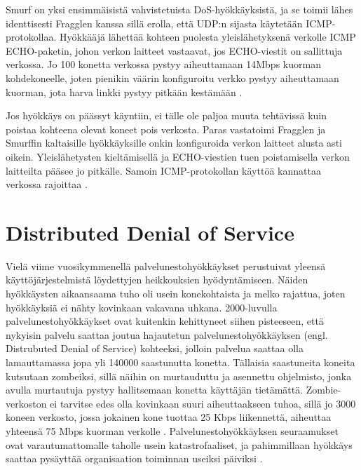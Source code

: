 Smurf on yksi ensimmäisistä vahvistetuista DoS-hyökkäyksistä, ja se
toimii lähes identtisesti Fragglen kanssa sillä erolla, että UDP:n
sijasta käytetään ICMP-pro\-to\-kol\-laa. Hyökkääjä lähettää kohteen
puolesta yleislähetyksenä verkolle ICMP ECHO-paketin, johon verkon
laitteet vastaavat, jos ECHO-viestit on sallittuja verkossa. Jo 100
konetta verkossa pystyy aiheuttamaan 14Mbps kuorman kohdekoneelle,
joten pienikin väärin konfiguroitu verkko pystyy aiheuttamaan kuorman,
jota harva linkki pystyy pitkään kestämään \cite{Hacking}.

Jos hyökkäys on päässyt käyntiin, ei tälle ole paljoa muuta tehtävissä
kuin poistaa kohteena olevat koneet pois verkosta. Paras vastatoimi
Fragglen ja Smurffin kaltaisille hyökkäyksille onkin konfiguroida
verkon laitteet alusta asti oikein. Yleislähetysten kieltämisellä ja
ECHO-viestien tuen poistamisella verkon laitteilta pääsee jo
pitkälle. Samoin ICMP-protokollan käyttöä kannattaa verkossa rajoittaa
\cite{Hacking}.

\section{Distributed Denial of Service}

Vielä viime vuosikymmenellä palvelunestohyökkäykset perustuivat yleensä
käyttöjärjestelmistä löydettyjen heikkouksien hyödyntämiseen. Näiden
hyökkäysten aikaansaama tuho oli usein konekohtaista ja melko rajattua, joten
hyökkäyksiä ei nähty kovinkaan vakavana uhkana. 2000-luvulla
palvelunestohyökkäykset ovat kuitenkin kehittyneet siihen pisteeseen, että
nykyisin palvelu saattaa joutua hajautetun palvelunestohyökkäyksen (engl.
Distrubuted Denial of Service) kohteeksi, jolloin palvelua saattaa olla
lamauttamassa jopa yli 140000 saastunutta konetta. Tällaisia saastuneita
koneita kutsutaan zombeiksi, sillä näihin on murtauduttu ja asennettu
ohjelmisto, jonka avulla murtautuja pystyy hallitsemaan konetta käyttäjän
tietämättä. Zombie-verkoston ei tarvitse edes olla kovinkaan suuri
aiheuttaakseen tuhoa, sillä jo 3000 koneen verkosto, jossa jokainen kone
tuottaa 25 Kbps liikennettä, aiheuttaa yhteensä 75 Mbps kuorman verkolle \cite{Hacking}.
Palvelunestohyökkäyksen seuraamukset ovat varautumattomalle
taholle usein katastrofaaliset, ja pahimmillaan hyökkäys saattaa pysäyttää
organisaation toiminnan useiksi päiviksi \cite{CERT}.

